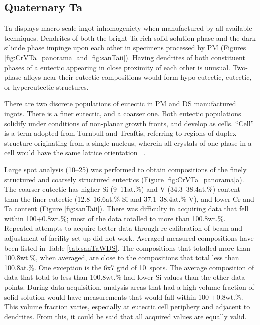 %
\subsection{Quaternary Ta}

Ta displays macro-scale ingot inhomogeniety when manufactured by all available techniques.  Dendrites of both the bright Ta-rich solid-solution phase and the dark silicide phase impinge upon each other in specimens processed by PM (Figures \ref{fig:CrVTa_panorama} and \ref{fig:sanTaii}).  Having dendrites of both constituent phases of a eutectic appearing in close proximity of each other is unusual.  Two-phase alloys near their eutectic compositions would form hypo-eutectic, eutectic, or hypereutectic structures.  

There are two discrete populations of eutectic in PM and DS manufactured ingots.  There is a finer eutectic, and a coarser one.  Both eutectic populations solidify under conditions of non-planar growth fronts, and develop as cells.  “Cell” is a term adopted from Turnbull and Treaftis, referring to regions of duplex structure originating from a single nucleus, wherein all crystals of one phase in a cell would have the same lattice orientation ~\cite{turnbull55}. 

Large spot analysis (10--25\micro\metre) was performed to obtain compositions of the finely structured and coarsely structured eutectics (Figure \ref{fig:CrVTa_panorama}a).  The coarser eutectic has higher Si (9--11at.\%) and V (34.3--38.4at.\%) content than the finer eutectic (12.8--16.6at.\% Si and 37.1--38.4at.\% V), and lower Cr and Ta content (Figure \ref{fig:sanTaii}).    There was difficulty in acquiring data that fell within 100+0.8wt.\%; most of the data totalled to more than 100.8wt.\%.  Repeated attempts to acquire better data through re-calibration of beam and adjustment of facility set-up did not work.  Averaged measured compositions have been listed in Table \ref{tab:sanTaWDS}.  The compositions that totalled more than 100.8wt.\%, when averaged, are close to the compositions that total less than 100.8at.\%.  One exception is the 6x7 grid of 10\micro\metre\ spots.  The average composition of data that total to less than 100.8wt.\% had lower Si values than the other data points.  During data acquisition, analysis areas that had a high volume fraction of solid-solution would have measurements that would fall within 100 $\pm$0.8wt.\%.  This volume fraction varies, especially at eutectic cell periphery and adjacent to dendrites.  From this, it could be said that all acquired values are equally valid.  

